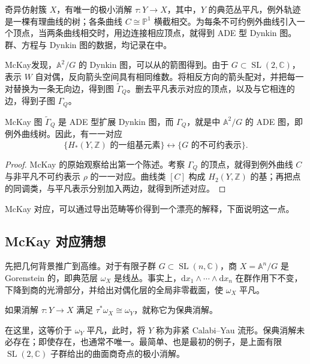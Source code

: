 奇异仿射簇 $X$，有唯一的极小消解 $\tau\colon Y\to X$，其中，$Y$ 的典范丛平凡，例外轨迹是一棵有理曲线的树；各条曲线 $C\cong\mathbb{P}^1$ 横截相交。为每条不可约例外曲线引入一个顶点，当两条曲线相交时，用边连接相应顶点，就得到 ADE 型 Dynkin 图。群、方程与 Dynkin 图的数据，均记录在中。

McKay发现，$\mathbb{A}^2/G$ 的 Dynkin 图，可以从的箭图得到。由于 $G\subset\operatorname{SL}(2,\mathbb{C})$，表示 $W$ 自对偶，反向箭头空间具有相同维数。将相反方向的箭头配对，并把每一对替换为一条无向边，得到图 $\widetilde\Gamma_Q$。删去平凡表示对应的顶点，以及与它相连的边，得到子图 $\Gamma_Q$。

\begin{theorem}\label{thm:4.85}
McKay 图 $\widetilde\Gamma_Q$ 是 ADE 型扩展 Dynkin 图，而 $\Gamma_Q$，就是中 $\mathbb{A}^2/G$ 的 ADE 图，即例外曲线树。因此，有一一对应
\[
\{H_*(Y,\mathbb{Z})\text{ 的一组基元素}\}
\longleftrightarrow\{G\text{ 的不可约表示}\}.
\]
\end{theorem}
\begin{proof}
McKay 的原始观察给出第一个陈述。考察 $\Gamma_Q$ 的顶点，就得到例外曲线 $C$ 与非平凡不可约表示 $\rho$ 的一一对应。曲线类 $[C]$ 构成 $H_2(Y,\mathbb{Z})$ 的基；再把点的同调类，与平凡表示分别加入两边，就得到所述对应。\BookQED
\end{proof}

McKay 对应，可以通过导出范畴等价得到一个漂亮的解释，下面说明这一点。

\subsection{McKay 对应猜想}\label{sec:4.7.2}

先把几何背景推广到高维。对于有限子群 $G\subset\operatorname{SL}(n,\mathbb{C})$，商 $X=\mathbb{A}^n/G$ 是 Gorenstein 的，即典范层 $\omega_X$ 是线丛。事实上，$\mathrm{d}x_1\wedge\cdots\wedge\mathrm{d}x_n$ 在群作用下不变，下降到商的光滑部分，并给出对偶化层的全局非零截面，使 $\omega_X$ 平凡。
\begin{definition*}\label{def:4.crepant-resolution}
如果消解 $\tau\colon Y\to X$ 满足 $\tau^*\omega_X\cong\omega_Y$，就称它为保典消解。
\end{definition*}
在这里，这等价于 $\omega_Y$ 平凡，此时，将 $Y$ 称为非紧 Calabi--Yau 流形。保典消解未必存在；即使存在，也通常不唯一。最简单、也是最初的例子，是上面有限 $\operatorname{SL}(2,\mathbb{C})$ 子群给出的曲面商奇点的极小消解。

